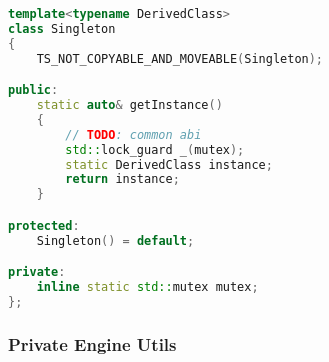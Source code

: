 \begin{lstlisting}[language=c++, caption=Singleton of Public Engine Utils(./engine/include/tsengine/utils.hpp)]
template<typename DerivedClass>
class Singleton
{
    TS_NOT_COPYABLE_AND_MOVEABLE(Singleton);

public:
    static auto& getInstance()
    {
        // TODO: common abi
        std::lock_guard _(mutex);
        static DerivedClass instance;
        return instance;
    }

protected:
    Singleton() = default;

private:
    inline static std::mutex mutex;
};
\end{lstlisting}

\newpage

\subsubsection{Private Engine Utils}
